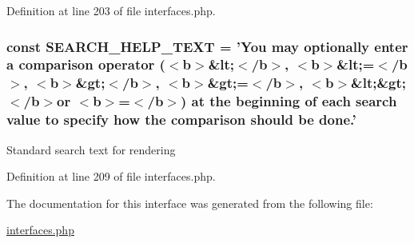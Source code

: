 Definition at line 203 of file interfaces.php.

\hypertarget{interfaceIXLController_a21930d5a45a39f983d1b157fd28819dc}{
\subsubsection[{SEARCH\_\-HELP\_\-TEXT}]{\setlength{\rightskip}{0pt plus 5cm}const {\bf SEARCH\_\-HELP\_\-TEXT} = 'You may optionally enter a comparison operator ($<$b$>$\&lt;$<$/b$>$, $<$b$>$\&lt;=$<$/b$>$, $<$b$>$\&gt;$<$/b$>$, $<$b$>$\&gt;=$<$/b$>$, $<$b$>$\&lt;\&gt;$<$/b$>$or $<$b$>$=$<$/b$>$) at the beginning of each search value to specify how the comparison should be done.'}}
\label{interfaceIXLController_a21930d5a45a39f983d1b157fd28819dc}
Standard search text for rendering 

Definition at line 209 of file interfaces.php.



The documentation for this interface was generated from the following file:\begin{DoxyCompactItemize}
\item 
\hyperlink{interfaces_8php}{interfaces.php}\end{DoxyCompactItemize}
